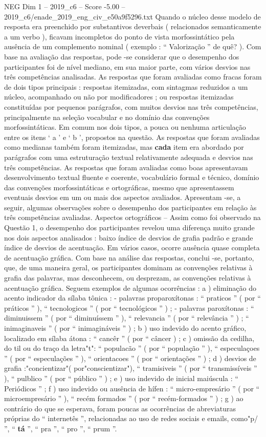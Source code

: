 \begin{textsample}{NEG Dim 1 – 2019\_c6 – Score -5.00 – 2019\_c6/enade\_2019\_eng\_civ\_e50a9f5296.txt}
Quando o núcleo desse modelo de resposta era preenchido por substantivos deverbais ( relacionados semanticamente a um verbo ), ficavam incompletos do ponto de vista morfossintático pela ausência de um complemento nominal ( exemplo : “ Valorização ” de quê? ).
Com base na avaliação das respostas, pode -se considerar que o desempenho dos participantes foi de nível mediano, em sua maior parte, com vários desvios nas três competências analisadas.
As respostas que foram avaliadas como fracas foram de dois tipos principais : respostas itemizadas, com sintagmas reduzidos a um núcleo, acompanhado ou não por modificadores ; ou respostas itemizadas constituídas por pequenos parágrafos, com muitos desvios nas três competências, principalmente na seleção vocabular e no domínio das convenções morfossintáticas.
Em comum nos dois tipos, a pouca ou nenhuma articulação entre os itens ‘ a ’ e ‘ b ’, propostos na questão.
As respostas que foram avaliadas como medianas também foram itemizadas, mas \textbf{cada} item era abordado por parágrafos com uma estruturação textual relativamente adequada e desvios nas três competências.
As respostas que foram avaliadas como boas apresentavam desenvolvimento textual fluente e coerente, vocabulário formal e técnico, domínio das convenções morfossintáticas e ortográficas, mesmo que apresentassem eventuais desvios em um ou mais dos aspectos avaliados.
Apresentam -se, a seguir, algumas observações sobre o desempenho dos participantes em relação às três competências avaliadas.
Aspectos ortográficos – Assim como foi observado na Questão 1, o desempenho dos participantes revelou uma diferença muito grande nos dois aspectos analisados : baixo índice de desvios de grafia padrão e grande índice de desvios de acentuação.
Em vários casos, ocorre ausência quase completa de acentuação gráfica.
Com base na análise das respostas, conclui -se, portanto, que, de uma maneira geral, os participantes dominam as convenções relativas à grafia das palavras, mas desconhecem, ou desprezam, as convenções relativas à acentuação gráfica.
Seguem exemplos de algumas ocorrências : a ) eliminação do acento indicador da sílaba tônica : - palavras proparoxítonas : “ praticos ” ( por “ práticos ” ), “ tecnologicos ” ( por “ tecnológicos ” ) ; - palavras paroxítonas : “ diminuissem ” ( por “ diminuíssem ” ), “ relevancia ” ( por “ relevância ” ) ; “ inimaginaveis ” ( por “ inimagináveis ” ) ; b ) uso indevido do acento gráfico, localizado em sílaba átona : “ cancêr ” ( por “ câncer ) ; c ) omissão da cedilha, do til ou do traço da letra"t": “ populacão ” ( por “ população ” ), “ especulaçoes ” ( por “ especulações ” ), “ orientacoes ” ( por “ orientações ” ) ; d ) desvios de grafia :"concientizar"( por"conscientizar"), “ tramisiveis ” ( por “ transmissíveis ” ), “ pulblico ” ( por “ público ” ) ; e ) uso indevido de inicial maiúscula : “ Periódicos ” ; f ) uso indevido ou ausência de hífen : “ micro-empresário ” ( por “ microempresário ” ), “ recém formados ” ( por “ recém-formados ” ) ; g ) ao contrário do que se esperava, foram poucas as ocorrências de abreviaturas próprias do “ internetês ”, relacionadas ao uso de redes sociais e emails, como"p/ ”, “ \textbf{tá} ”, “ pra ”, “ pro ”, “ prum ”.

\end{textsample}
